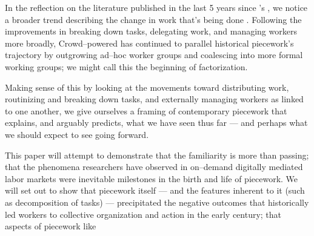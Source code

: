 \documentclass{sigchi}
\newcommand{\msb}[1]{{\color{PineGreen}[MSB: #1]}}
\begin{document}
In the reflection on the literature published in the last 5 years since
\citeauthor{crowdworkFuture}'s 
,
we notice a broader trend describing the change in work that's being done
\cite{crowdworkFuture}.
Following the improvements in
breaking down tasks,
delegating work, and
managing workers more broadly,
Crowd--powered has continued to parallel historical piecework's trajectory
by outgrowing ad--hoc worker groups and coalescing into more formal working groups;
we might call this the beginning of factorization.


Making sense of this 
by looking at the movements toward
distributing work,
routinizing and breaking down tasks,
and externally managing workers
as linked to one another, 
we give ourselves a framing of contemporary piecework that explains,
and arguably predicts,
what we have seen thus far
--- and perhaps what we should expect to see going forward.

This paper will attempt to demonstrate that the familiarity is more than passing;
that the phenomena researchers have observed in on--demand digitally mediated labor markets
were inevitable milestones in the birth and life of piecework.
We will set out to show that piecework itself
--- and the features inherent to it (such as decomposition of tasks) --- %
precipitated the negative outcomes that historically led workers to collective organization and action in the early  century;
that aspects of piecework like 
\end{document}
